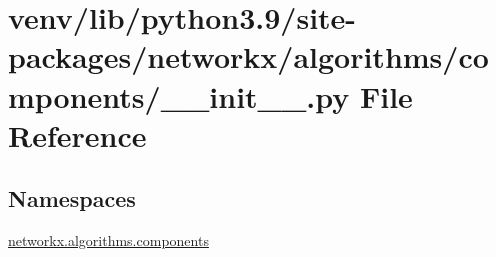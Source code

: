 \hypertarget{venv_2lib_2python3_89_2site-packages_2networkx_2algorithms_2components_2____init_____8py}{}\section{venv/lib/python3.9/site-\/packages/networkx/algorithms/components/\+\_\+\+\_\+init\+\_\+\+\_\+.py File Reference}
\label{venv_2lib_2python3_89_2site-packages_2networkx_2algorithms_2components_2____init_____8py}
\subsection*{Namespaces}
\begin{DoxyCompactItemize}
\item 
 \hyperlink{namespacenetworkx_1_1algorithms_1_1components}{networkx.\+algorithms.\+components}
\end{DoxyCompactItemize}
